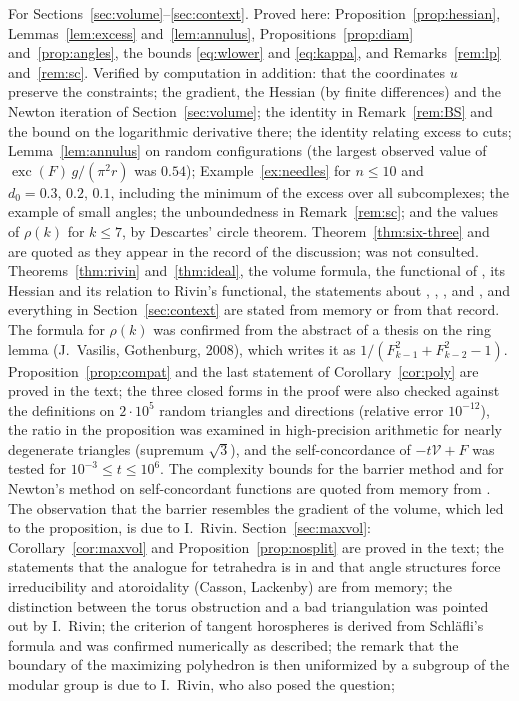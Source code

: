 \documentclass[11pt]{amsart}
\theoremstyle{definition}
\theoremstyle{remark}
\DeclareMathOperator{\exc}{exc}
\begin{document}
For Sections~\ref{sec:volume}--\ref{sec:context}. Proved here: Proposition~\ref{prop:hessian}, Lemmas~\ref{lem:excess} and~\ref{lem:annulus}, Propositions~\ref{prop:diam} and~\ref{prop:angles}, the bounds \eqref{eq:wlower} and \eqref{eq:kappa}, and Remarks~\ref{rem:lp} and~\ref{rem:sc}.
Verified by computation in addition: that the coordinates $u$ preserve the constraints; the gradient, the Hessian (by finite differences) and the Newton iteration of Section~\ref{sec:volume}; the identity in Remark~\ref{rem:BS} and the bound on the logarithmic derivative there; the identity relating excess to cuts;
Lemma~\ref{lem:annulus} on random configurations (the largest observed value of $\exc(F)\,g/(\pi^2r)$ was $0.54$); Example~\ref{ex:needles} for $n\le10$ and $d_0=0.3,\,0.2,\,0.1$, including the minimum of the excess over all subcomplexes; the example of small angles; the unboundedness in Remark~\ref{rem:sc};
and the values of $\rho(k)$ for $k\le7$, by Descartes' circle theorem.
Theorem~\ref{thm:six-three} and \cite[Lemma~6.5]{Riv03} are quoted as they appear in the record of the discussion; \cite{Riv03} was not consulted. Theorems~\ref{thm:rivin} and~\ref{thm:ideal}, the volume formula, the functional of \cite{BS04}, its Hessian and its relation to Rivin's functional, the statements about \cite{BPS15}, \cite{FG11}, \cite{He99}, \cite{Moh93} and \cite{CS03},
and everything in Section~\ref{sec:context} are stated from memory or from that record. The formula for $\rho(k)$ was confirmed from the abstract of a thesis on the ring lemma (J.~Vasilis, Gothenburg, 2008), which writes it as $1/(F_{k-1}^2+F_{k-2}^2-1)$.
Proposition~\ref{prop:compat} and the last statement of Corollary~\ref{cor:poly} are proved in the text; the three closed forms in the proof were also checked against the definitions on $2\cdot10^5$ random triangles and directions (relative error $10^{-12}$), the ratio in the proposition was examined in high-precision arithmetic for nearly degenerate triangles (supremum $\sqrt3$),
and the self-concordance of $-t\mathcal V+F$ was tested for $10^{-3}\le t\le10^6$. The complexity bounds for the barrier method and for Newton's method on self-concordant functions are quoted from memory from \cite{NN94,BV04}. The observation that the barrier resembles the gradient of the volume, which led to the proposition, is due to I.~Rivin.
Section~\ref{sec:maxvol}: Corollary~\ref{cor:maxvol} and Proposition~\ref{prop:nosplit} are proved in the text; the statements that the analogue for tetrahedra is in \cite{FG11} and that angle structures force irreducibility and atoroidality (Casson, Lackenby) are from memory; the distinction between the torus obstruction and a bad triangulation was pointed out by I.~Rivin; the criterion of tangent horospheres is derived from Schl\"afli's formula and was confirmed numerically as described; the remark that the boundary of the maximizing polyhedron is then uniformized by a subgroup of the modular group is due to I.~Rivin, who also posed the question;
\end{document}
